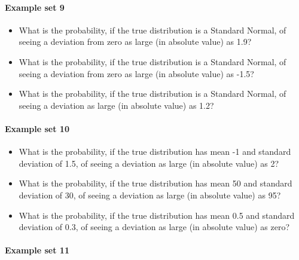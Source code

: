 \documentclass[]{article}
\providecommand{\tightlist}{%
  \setlength{\itemsep}{0pt}\setlength{\parskip}{0pt}}
\let\oldparagraph\paragraph
\renewcommand{\paragraph}[1]{\oldparagraph{#1}\mbox{}}
\begin{document}
\paragraph{Example set 9}\label{example-set-9}

\begin{itemize}
\tightlist
\item
  What is the probability, if the true distribution is a Standard
  Normal, of seeing a deviation from zero as large (in absolute value)
  as 1.9?
\item
  What is the probability, if the true distribution is a Standard
  Normal, of seeing a deviation from zero as large (in absolute value)
  as -1.5?
\item
  What is the probability, if the true distribution is a Standard
  Normal, of seeing a deviation as large (in absolute value) as 1.2?
\end{itemize}

\paragraph{Example set 10}\label{example-set-10}

\begin{itemize}
\tightlist
\item
  What is the probability, if the true distribution has mean -1 and
  standard deviation of 1.5, of seeing a deviation as large (in absolute
  value) as 2?
\item
  What is the probability, if the true distribution has mean 50 and
  standard deviation of 30, of seeing a deviation as large (in absolute
  value) as 95?
\item
  What is the probability, if the true distribution has mean 0.5 and
  standard deviation of 0.3, of seeing a deviation as large (in absolute
  value) as zero?
\end{itemize}

\paragraph{Example set 11}\label{example-set-11}
\end{document}
